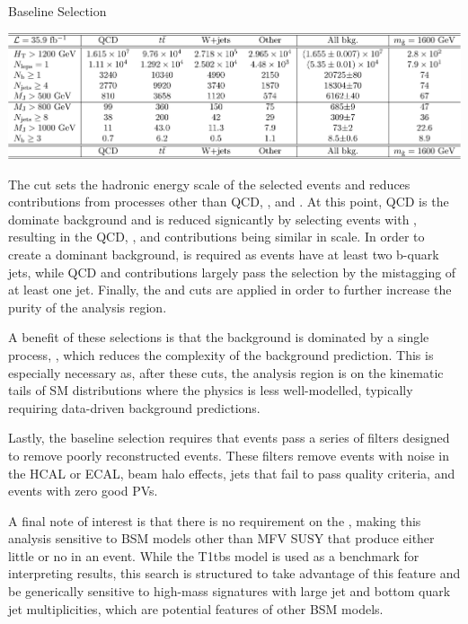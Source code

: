 \begin{section}{Baseline Selection}
\begin{table}[tbp!]
\centering
\includegraphics[angle=0,width=0.90\columnwidth]{fig/cutflow.pdf}
\caption{Expected yields in $35~\ifb$ from simulations of SM and signal processes.
Rows above the horizontal line correspond to requirements in the baseline selection, while those below correspond to additional kinematic cuts.}
\label{tab:cutflow}
\end{table}

The \baseHT cut sets the hadronic energy scale of the selected events and reduces contributions from processes other than QCD, \ttbar, and \Wjets.
At this point, QCD is the dominate background and is reduced signicantly by selecting events with \baseNleps, resulting in the QCD, \ttbar, and \Wjets contributions being similar in scale.
In order to create a \ttbar dominant background, \baseNb is required as \ttbar events have at least two b-quark jets, while QCD and \Wjets contributions largely pass the selection by the mistagging of at least one jet.
Finally, the \baseNjets and \baseMJ cuts are applied in order to further increase the \ttbar purity of the analysis region.

A benefit of these selections is that the background is dominated by a single process, \ttbar, which reduces the complexity of the background prediction.
This is especially necessary as, after these cuts, the analysis region is on the kinematic tails of SM distributions where the physics is less well-modelled, typically requiring data-driven background predictions.

Lastly, the baseline selection requires that events pass a series of filters designed to remove poorly reconstructed events. 
These filters remove events with noise in the HCAL or ECAL, beam halo effects, jets that fail to pass quality criteria, and events with zero good PVs.

A final note of interest is that there is no requirement on the \MET, making this analysis sensitive to BSM models other than MFV SUSY that produce either little or no \MET in an event.
While the T1tbs model is used as a benchmark for interpreting results, this search is structured to take advantage of this feature and be generically sensitive to high-mass signatures with large jet and bottom quark jet multiplicities, which are potential features of other BSM models.

\end{section}


